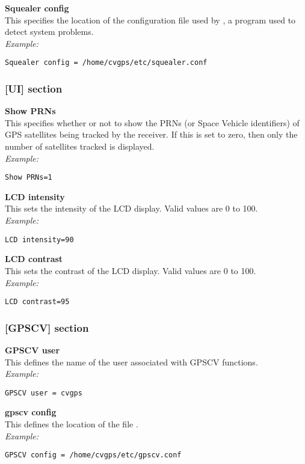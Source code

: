 {\bfseries Squealer config}\\
This  specifies the location of the configuration file used by , a
program used to detect system problems.\\
\textit{Example:}
\begin{lstlisting}
Squealer config = /home/cvgps/etc/squealer.conf
\end{lstlisting}

\subsubsection{[UI] section}
{\bfseries Show PRNs}\\
This specifies whether or not to show the PRNs (or Space Vehicle identifiers) of
GPS satellites being tracked by the receiver. If this is set to zero, then only
the number of satellites tracked is displayed.\\
\textit{Example:}
\begin{lstlisting}
Show PRNs=1
\end{lstlisting}

{\bfseries LCD intensity}\\
This sets the intensity of the LCD display. Valid values are 0 to 100.\\
\textit{Example:}
\begin{lstlisting}
LCD intensity=90
\end{lstlisting}

{\bfseries LCD contrast}\\
This sets the contrast of the LCD display. Valid values are 0 to 100.\\
\textit{Example:}
\begin{lstlisting}
LCD contrast=95
\end{lstlisting}

\subsubsection{[GPSCV] section}
{\bfseries GPSCV user}\\
This  defines the name of the user associated with GPSCV functions.\\
\textit{Example:}
\begin{lstlisting}
GPSCV user = cvgps
\end{lstlisting}

{\bfseries gpscv config}\\
This defines the location of the file .\\
\textit{Example:}
\begin{lstlisting}
GPSCV config = /home/cvgps/etc/gpscv.conf
\end{lstlisting}


